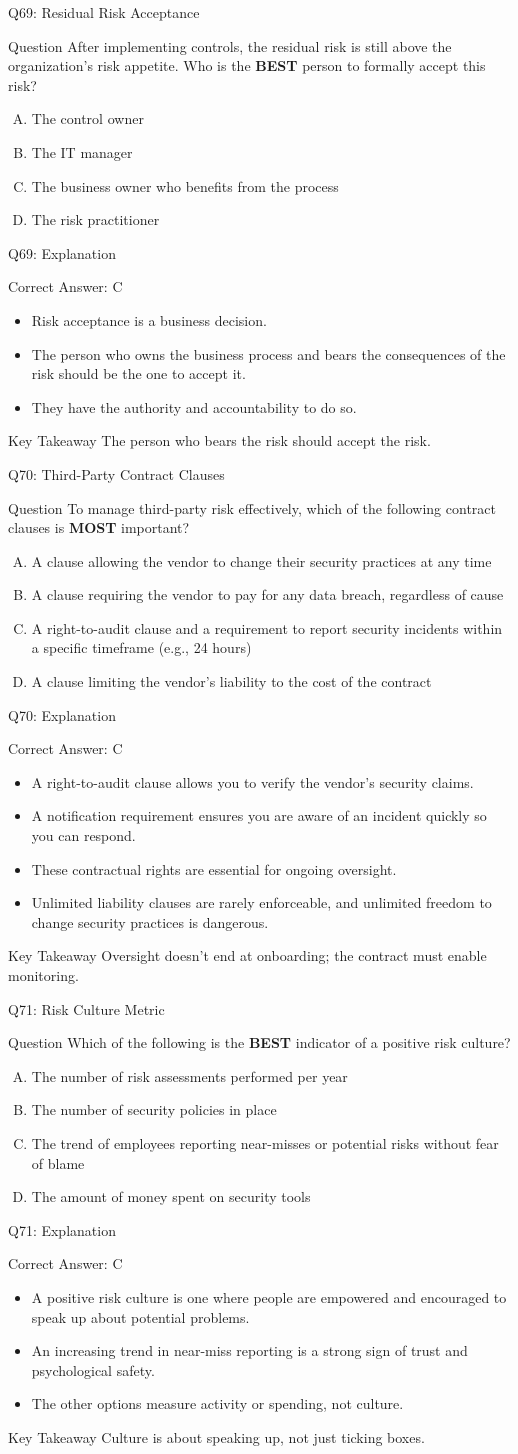 \documentclass[aspectratio=169]{beamer}
\newcommand{\hq}[7]{%
	\begin{frame}{Q#1: #2}
		\begin{block}{Question}
			#3
		\end{block}
		\begin{enumerate}[(A)]
			#4
		\end{enumerate}
	\end{frame}
	\begin{frame}{Q#1: Explanation}
		\begin{block}{Correct Answer: #5}
			\begin{itemize}
				#6
			\end{itemize}
		\end{block}
		\begin{alertblock}{Key Takeaway}
			#7
		\end{alertblock}
	\end{frame}
}
\begin{document}
	\hq{69}{Residual Risk Acceptance}
	{After implementing controls, the residual risk is still above the organization's risk appetite. Who is the \textbf{BEST} person to formally accept this risk?}
	{\item The control owner
		\item The IT manager
		\item The business owner who benefits from the process
		\item The risk practitioner}
	{C}
	{\item Risk acceptance is a business decision.
		\item The person who owns the business process and bears the consequences of the risk should be the one to accept it.
		\item They have the authority and accountability to do so.}
	{The person who bears the risk should accept the risk.}
	
	\hq{70}{Third-Party Contract Clauses}
	{To manage third-party risk effectively, which of the following contract clauses is \textbf{MOST} important?}
	{\item A clause allowing the vendor to change their security practices at any time
		\item A clause requiring the vendor to pay for any data breach, regardless of cause
		\item A right-to-audit clause and a requirement to report security incidents within a specific timeframe (e.g., 24 hours)
		\item A clause limiting the vendor's liability to the cost of the contract}
	{C}
	{\item A right-to-audit clause allows you to verify the vendor's security claims.
		\item A notification requirement ensures you are aware of an incident quickly so you can respond.
		\item These contractual rights are essential for ongoing oversight.
		\item Unlimited liability clauses are rarely enforceable, and unlimited freedom to change security practices is dangerous.}
	{Oversight doesn't end at onboarding; the contract must enable monitoring.}
	
	\hq{71}{Risk Culture Metric}
	{Which of the following is the \textbf{BEST} indicator of a positive risk culture?}
	{\item The number of risk assessments performed per year
		\item The number of security policies in place
		\item The trend of employees reporting near-misses or potential risks without fear of blame
		\item The amount of money spent on security tools}
	{C}
	{\item A positive risk culture is one where people are empowered and encouraged to speak up about potential problems.
		\item An increasing trend in near-miss reporting is a strong sign of trust and psychological safety.
		\item The other options measure activity or spending, not culture.}
	{Culture is about speaking up, not just ticking boxes.}
	
\end{document}
